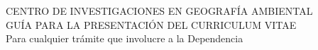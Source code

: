 \documentclass[12pt]{report}
\begin{document}
\begin{center}
 CENTRO DE INVESTIGACIONES EN GEOGRAFÍA AMBIENTAL \\
GUÍA PARA LA PRESENTACIÓN DEL CURRICULUM VITAE \\
Para cualquier trámite que involucre a la Dependencia
\end{center}

\renewcommand{\labelenumi}{%
 \textbf{\theenumi}. }

\renewcommand{\theenumii}{\arabic{enumii}}
\renewcommand{\labelenumii}{%
    \textbf{\theenumi}.\theenumii. }

\renewcommand{\theenumiii}{\arabic{enumiii}}
\renewcommand{\labelenumiii}{%
    \textbf{\theenumi}.\theenumii.\theenumiii.}

\renewcommand{\labelitemi}{\tiny$\blacksquare$}
\renewcommand{\labelitemii}{\tiny$\blacksquare$}
\renewcommand{\labelitemiii}{\tiny$\blacksquare$}
\end{document}
